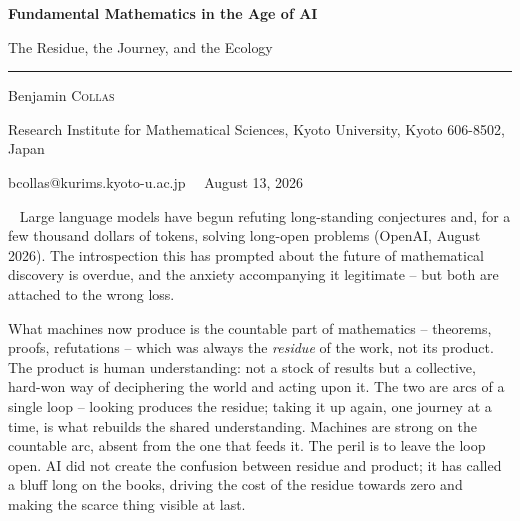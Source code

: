 \documentclass[11pt, a4paper,twosided]{amsart}
\newcommand{\titleblock}[5]{%
    \begingroup
    \centering
    {\sffamily\bfseries\LARGE\color{Navy} #1\par}
    \vspace{0.45em}
    {\sffamily\large\color{Navy!72} #2\par}
    \vspace{0.75em}
    {\color{Navy}\rule{\linewidth}{0.9pt}}\par
    \vspace{0.75em}
    {\sffamily\normalsize\color{DarkGray} #3\par}
    \vspace{0.2em}
    {\sffamily\footnotesize\color{LightGray} #4\par}
    \vspace{0.45em}
    {\ttfamily\footnotesize\color{LightGray} #5\par}
    \vspace{1.4em}
    \endgroup}
\newenvironment{abstractblock}
    {\begingroup\small\color{DarkGray}
     \setlength{\leftskip}{1.6em}\setlength{\rightskip}{1.6em}
     \noindent{\bfseries\color{Navy}Abstract.}\ \ignorespaces}
    {\par\endgroup\vspace{1.2em}}
\begin{document}
\titleblock
  {Fundamental Mathematics in the Age of AI}
  {The Residue, the Journey, and the Ecology}
  {Benjamin \textsc{Collas}}
  {Research Institute for Mathematical Sciences, Kyoto University, Kyoto 606-8502, Japan}
  {bcollas@kurims.kyoto-u.ac.jp \ \textperiodcentered\ August 13, 2026}


\vspace{2cm}

\begin{abstractblock}
  Large language models have begun refuting long-standing conjectures and, for a few thousand dollars of tokens, solving long-open problems (OpenAI, August 2026). The introspection this has prompted about the future of mathematical discovery is overdue, and the anxiety accompanying it legitimate -- but both are attached to the wrong loss. 
  
  What machines now produce is the countable part of mathematics -- theorems, proofs, refutations -- which was always the \emph{residue} of the work, not its product. The product is human understanding: not a stock of results but a collective, hard-won way of deciphering the world and acting upon it. The two are arcs of a single loop -- looking produces the residue; taking it up again, one journey at a time, is what rebuilds the shared understanding. Machines are strong on the countable arc, absent from the one that feeds it. The peril is to leave the loop open. AI did not create the confusion between residue and product; it has called a bluff long on the books, driving the cost of the residue towards zero and making the scarce thing visible at last. 
  

\end{abstractblock}
\end{document}
